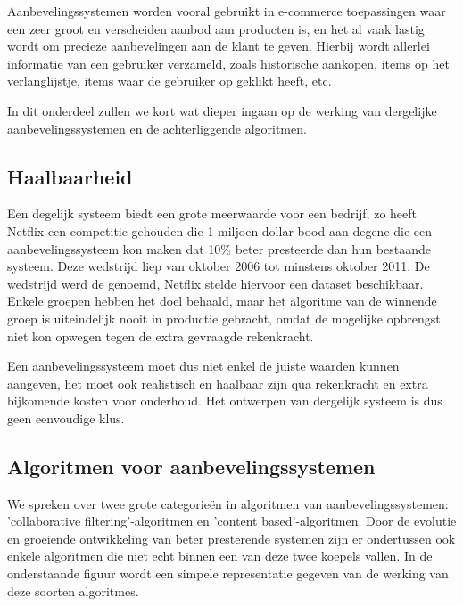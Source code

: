 Aanbevelingssystemen worden vooral gebruikt in e-commerce toepassingen waar een zeer groot en verscheiden aanbod aan producten is, en het al vaak lastig wordt om precieze aanbevelingen aan de klant te geven. Hierbij wordt allerlei informatie van een gebruiker verzameld, zoals historische aankopen, items op het verlanglijstje, items waar de gebruiker op geklikt heeft, etc.

In dit onderdeel zullen we kort wat dieper ingaan op de werking van dergelijke aanbevelingssystemen en de achterliggende algoritmen.

\subsection{Haalbaarheid}
\label{sec:Haalbaarheid}

Een degelijk systeem biedt een grote meerwaarde voor een bedrijf, zo heeft Netflix een competitie gehouden die 1 miljoen dollar bood aan degene die een aanbevelingssysteem kon maken dat 10\% beter presteerde dan hun bestaande systeem. 
\newpage
Deze wedstrijd liep van oktober 2006 tot minstens oktober 2011. De wedstrijd werd de \cite{NetflixPrize} genoemd, Netflix stelde hiervoor een dataset beschikbaar. Enkele groepen hebben het doel behaald, maar het algoritme van de winnende groep is uiteindelijk nooit in productie gebracht, omdat de mogelijke opbrengst niet kon opwegen tegen de extra gevraagde rekenkracht. 

Een aanbevelingssysteem moet dus niet enkel de juiste waarden kunnen aangeven, het moet ook realistisch en haalbaar zijn qua rekenkracht en extra bijkomende kosten voor onderhoud. Het ontwerpen van dergelijk systeem is dus geen eenvoudige klus.

\subsection{Algoritmen voor aanbevelingssystemen}
\label{sec:Algoritmen voor aanbevelingssystemen}

We spreken over twee grote categorieën in algoritmen van aanbevelingssystemen: 'collaborative filtering'-algoritmen en 'content based'-algoritmen.  \autocite{Adamovicius2005} Door de evolutie en groeiende ontwikkeling van beter presterende systemen zijn er ondertussen ook enkele algoritmen die niet echt binnen een van deze twee koepels vallen. In de onderstaande figuur wordt een simpele representatie gegeven van de werking van deze soorten algoritmes.

